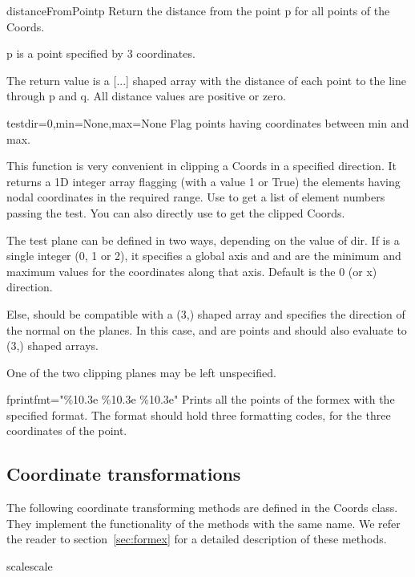 \begin{methoddesc}{distanceFromPoint}{p}
    Return the distance from the point p for all points of the Coords.

    p is a point specified by 3 coordinates.

    The return value is a [...] shaped array with the distance of
    each point to the line through p and q.
    All distance values are positive or zero.
\end{methoddesc}


\begin{methoddesc}{test}{dir=0,min=None,max=None}
  Flag points having coordinates between min and max.
  
This function is very convenient in clipping a Coords in a specified
direction. It returns a 1D integer array flagging (with a value 1 or
True) the elements having nodal coordinates in the required range.
Use  to get a list of element numbers passing the test.
You can also directly use  to get the clipped Coords.
  
The test plane can be defined in two ways, depending on the value of dir.
If  is a single integer (0, 1 or 2), it specifies a global axis
and  and  are the minimum and maximum values for the
coordinates along that axis.
Default is the 0 (or x) direction.

Else,  should be compatible with a (3,) shaped array and specifies
the direction of the normal on the planes. In this case,  and 
are points and should also evaluate to (3,) shaped arrays.

One of the two clipping planes may be left unspecified.
\end{methoddesc}


\begin{methoddesc}{fprint}{fmt="\%10.3e \%10.3e \%10.3e"}
Prints all the points of the formex with the specified format. The format should hold three formatting codes, for the three coordinates of the point. 
\end{methoddesc}
 

\subsection{Coordinate transformations}

The following coordinate transforming methods are defined in the Coords class.
They implement the functionality of the  methods with the same name. We refer the reader to section~\ref{sec:formex} for a detailed description of these methods. 
\begin{methoddesc}{scale}{scale}
\end{methoddesc}

